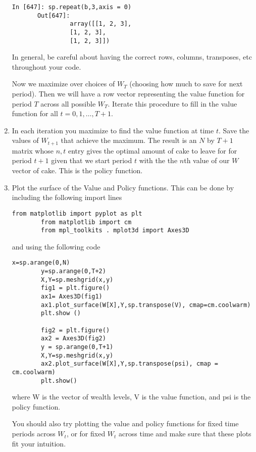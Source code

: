 \begin{problem}
\begin{enumerate}
\begin{lstlisting}[style = python]
       In [647]: sp.repeat(b,3,axis = 0)
       Out[647]:
                array([[1, 2, 3],
                [1, 2, 3],
                [1, 2, 3]])
       \end{lstlisting}
        
       In general, be careful about having the correct rows, columns, transposes, etc throughout your code. 
       
       Now we maximize over choices of $W_T$ (choosing how much to save for next period).  Then we will have a row vector representing the value function for period $T$ across all possible $W_T$.  Iterate this procedure to fill in the value function for all $t=0,1,\ldots, T+1$.

   \item In each iteration you maximize to find the value function at time $t$.  Save the values of $W_{t+1}$ that achieve the maximum.  The result is an $N$ by $T+1$ matrix whose $n,t$ entry gives the optimal amount of cake to leave for for period $t+1$ given that we start period $t$ with the the $n$th value of our $W$ vector of cake.  This is the policy function.

   \item Plot the surface of the Value and Policy functions.  This can be done by including the following import lines
        
        \begin{lstlisting}[style = python]
        from matplotlib import pyplot as plt
        from matplotlib import cm
        from mpl_toolkits . mplot3d import Axes3D
        \end{lstlisting}
        
        and using the following code
          
        \begin{lstlisting}[style = python]
        x=sp.arange(0,N)
        y=sp.arange(0,T+2)
        X,Y=sp.meshgrid(x,y)
        fig1 = plt.figure()
        ax1= Axes3D(fig1)
        ax1.plot_surface(W[X],Y,sp.transpose(V), cmap=cm.coolwarm)
        plt.show ()

        fig2 = plt.figure()
        ax2 = Axes3D(fig2)
        y = sp.arange(0,T+1)
        X,Y=sp.meshgrid(x,y)
        ax2.plot_surface(W[X],Y,sp.transpose(psi), cmap = cm.coolwarm)
        plt.show()
        \end{lstlisting}

        where W is the vector of wealth levels, V is the value function, and psi is the policy function.
          
        You should also try plotting the value and policy functions for fixed time periods across $W_t$, or for fixed $W_t$ across time and make sure that these plots fit your intuition.

\end{enumerate}
\end{problem}

